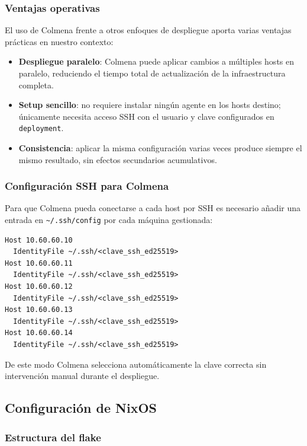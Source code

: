 \documentclass[a4paper, 11pt]{article}
\begin{document}
\subsubsection{Ventajas operativas}

El uso de Colmena frente a otros enfoques de despliegue aporta varias ventajas 
prácticas en nuestro contexto:

\begin{itemize}
  \item \textbf{Despliegue paralelo}: Colmena puede aplicar cambios a múltiples 
    hosts en paralelo, reduciendo el tiempo total de actualización de la 
    infraestructura completa.
  \item \textbf{Setup sencillo}: no requiere instalar ningún agente en los hosts 
    destino; únicamente necesita acceso SSH con el usuario y clave configurados 
    en \texttt{deployment}.
  \item \textbf{Consistencia}: aplicar la misma configuración varias veces 
    produce siempre el mismo resultado, sin efectos secundarios acumulativos.
\end{itemize}

\subsubsection{Configuración SSH para Colmena}

Para que Colmena pueda conectarse a cada host por SSH es necesario añadir 
una entrada en \texttt{\textasciitilde/.ssh/config} por cada máquina gestionada:

\begin{lstlisting}[style=bash]
Host 10.60.60.10
  IdentityFile ~/.ssh/<clave_ssh_ed25519>
Host 10.60.60.11
  IdentityFile ~/.ssh/<clave_ssh_ed25519>
Host 10.60.60.12
  IdentityFile ~/.ssh/<clave_ssh_ed25519>
Host 10.60.60.13
  IdentityFile ~/.ssh/<clave_ssh_ed25519>
Host 10.60.60.14
  IdentityFile ~/.ssh/<clave_ssh_ed25519>
\end{lstlisting}

De este modo Colmena selecciona automáticamente la clave correcta sin 
intervención manual durante el despliegue.

\subsection{Configuración de NixOS}

\subsubsection{Estructura del flake}
\end{document}

